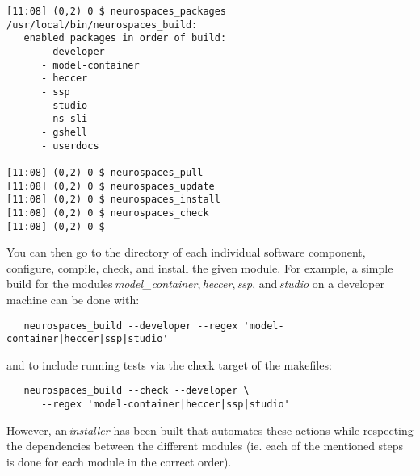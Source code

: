 \documentclass[12pt]{article}
\begin{document}
\begin{itemize}
\begin{enumerate}
\begin{verbatim}
[11:08] (0,2) 0 $ neurospaces_packages
/usr/local/bin/neurospaces_build:
   enabled packages in order of build:
      - developer
      - model-container
      - heccer
      - ssp
      - studio
      - ns-sli
      - gshell
      - userdocs

[11:08] (0,2) 0 $ neurospaces_pull
[11:08] (0,2) 0 $ neurospaces_update
[11:08] (0,2) 0 $ neurospaces_install
[11:08] (0,2) 0 $ neurospaces_check
[11:08] (0,2) 0 $ 
\end{verbatim}
\end{enumerate}
\end{itemize}

You can then go to the directory of each individual software component, configure, compile, check, and install the given module. For example, a simple build for the modules\,{\it model\_container},\,{\it heccer},\,{\it ssp}, and\,{\it studio} on a developer machine can be done with:  
\begin{verbatim}
   neurospaces_build --developer --regex 'model-container|heccer|ssp|studio'
\end{verbatim}
and to include running tests via the check target of the makefiles:
\begin{verbatim}
   neurospaces_build --check --developer \
      --regex 'model-container|heccer|ssp|studio'
\end{verbatim}
However, an\,{\it installer} has been built that automates these actions while respecting the dependencies between the different modules (ie. each of the mentioned steps is done for each module in the correct order).



\end{document}
